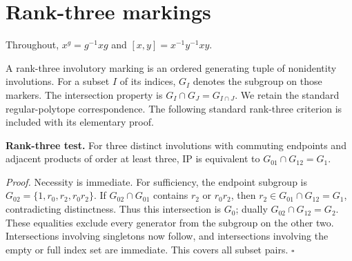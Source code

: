 \section{Rank-three markings}\label{rank-three-markings}

Throughout, \(x^g=g^{-1}xg\) and \([x,y]=x^{-1}y^{-1}xy\).

A rank-three involutory marking is an ordered generating tuple of nonidentity involutions. For a subset
\(I\) of its indices, \(G_I\) denotes the subgroup on those markers. The
intersection property is \(G_I\cap G_J=G_{I\cap J}\). We retain the standard
regular-polytope correspondence. The following standard rank-three criterion is included with its elementary proof.

\textbf{Rank-three test.} For three distinct involutions with commuting
endpoints and adjacent products of order at least three, IP is equivalent
to \(G_{01}\cap G_{12}=G_1\).

\emph{Proof.} Necessity is immediate. For sufficiency, the endpoint subgroup
is \(G_{02}=\{1,r_0,r_2,r_0r_2\}\). If \(G_{02}\cap G_{01}\) contains
\(r_2\) or \(r_0r_2\), then \(r_2\in G_{01}\cap G_{12}=G_1\), contradicting
distinctness. Thus this intersection is \(G_0\); dually
\(G_{02}\cap G_{12}=G_2\). These equalities exclude every generator from
the subgroup on the other two. Intersections involving singletons now
follow, and intersections involving the empty or full index set are
immediate. This covers all subset pairs. \(\square\)
